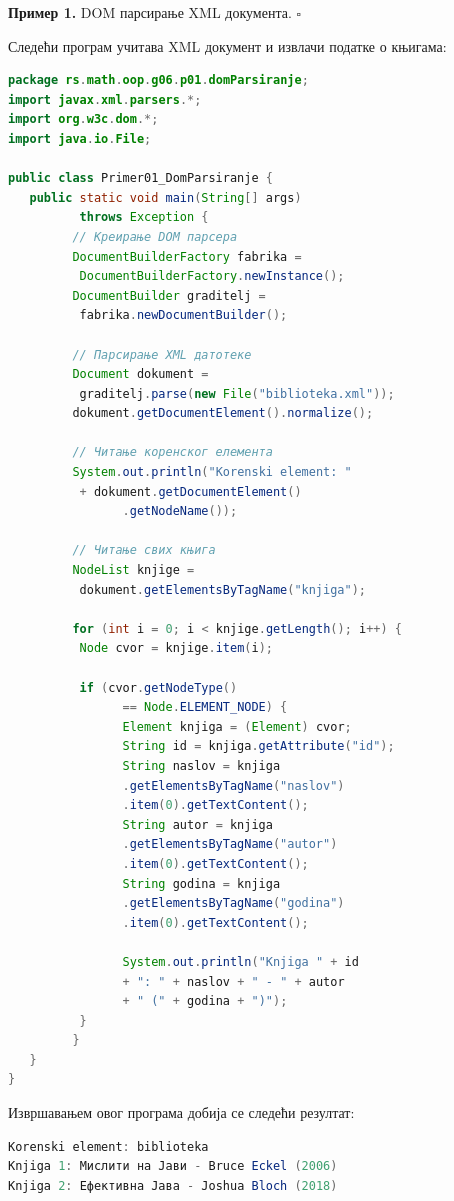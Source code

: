 \bigskip

\noindent \textbf{Пример 1.} DOM парсирање XML документа. $\square$

\medskip

Следећи програм учитава XML документ и извлачи податке о књигама:


\begin{lstlisting}[language=Java]
package rs.math.oop.g06.p01.domParsiranje;
import javax.xml.parsers.*;
import org.w3c.dom.*;
import java.io.File;
 
public class Primer01_DomParsiranje {
   public static void main(String[] args)
          throws Exception {
         // Креирање DOM парсера
         DocumentBuilderFactory fabrika =
          DocumentBuilderFactory.newInstance();
         DocumentBuilder graditelj =
          fabrika.newDocumentBuilder();
 
         // Парсирање XML датотеке
         Document dokument =
          graditelj.parse(new File("biblioteka.xml"));
         dokument.getDocumentElement().normalize();
 
         // Читање коренског елемента
         System.out.println("Korenski element: "
          + dokument.getDocumentElement()
                .getNodeName());
 
         // Читање свих књига
         NodeList knjige =
          dokument.getElementsByTagName("knjiga");
 
         for (int i = 0; i < knjige.getLength(); i++) {
          Node cvor = knjige.item(i);
 
          if (cvor.getNodeType()
                == Node.ELEMENT_NODE) {
                Element knjiga = (Element) cvor;
                String id = knjiga.getAttribute("id");
                String naslov = knjiga
                .getElementsByTagName("naslov")
                .item(0).getTextContent();
                String autor = knjiga
                .getElementsByTagName("autor")
                .item(0).getTextContent();
                String godina = knjiga
                .getElementsByTagName("godina")
                .item(0).getTextContent();
 
                System.out.println("Knjiga " + id
                + ": " + naslov + " - " + autor
                + " (" + godina + ")");
          }
         }
   }
}
\end{lstlisting}


Извршавањем овог програма добија се следећи резултат:


\begin{lstlisting}[language=Java]
Korenski element: biblioteka
Knjiga 1: Мислити на Јави - Bruce Eckel (2006)
Knjiga 2: Ефективна Јава - Joshua Bloch (2018)
\end{lstlisting}


